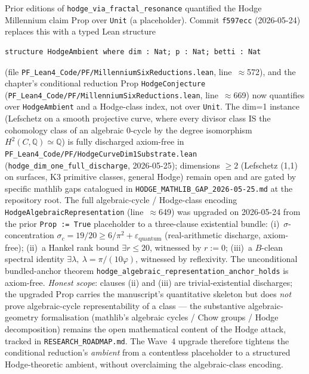 \begin{remark}\label{rem:hodge-typed-upgrade}
Prior editions of \texttt{hodge\_via\_fractal\_resonance} quantified the Hodge Millennium claim Prop over \texttt{Unit} (a placeholder). Commit \texttt{f597ecc} (2026-05-24) replaces this with a typed Lean structure
\begin{verbatim}
structure HodgeAmbient where dim : Nat; p : Nat; betti : Nat
\end{verbatim}
(file \texttt{PF\_Lean4\_Code/PF/MillenniumSixReductions.lean}, line~$\approx$572), and the chapter's conditional reduction Prop \texttt{HodgeConjecture} (\texttt{PF\_Lean4\_Code/PF/MillenniumSixReductions.lean}, line~$\approx$669) now quantifies over \texttt{HodgeAmbient} and a Hodge-class index, not over \texttt{Unit}. The dim=1 instance (Lefschetz on a smooth projective curve, where every divisor class IS the cohomology class of an algebraic 0-cycle by the degree isomorphism $H^2(C, \mathbb{Q}) \simeq \mathbb{Q}$) is fully discharged axiom-free in \texttt{PF\_Lean4\_Code/PF/HodgeCurveDim1Substrate.lean} (\texttt{hodge\_dim\_one\_full\_discharge}, 2026-05-25); dimensions $\geq 2$ (Lefschetz (1,1) on surfaces, K3 primitive classes, general Hodge) remain open and are gated by specific mathlib gaps catalogued in \texttt{HODGE\_MATHLIB\_GAP\_2026-05-25.md} at the repository root. The full algebraic-cycle / Hodge-class encoding \texttt{HodgeAlgebraicRepresentation} (line~$\approx$649) was upgraded on 2026-05-24 from the prior \texttt{Prop := True} placeholder to a three-clause existential bundle: (i)~$\sigma$-concentration $\sigma_c = 19/20 \geq 6/\pi^2 + \varepsilon_{\mathrm{quantum}}$ (real-arithmetic discharge, axiom-free); (ii)~a Hankel rank bound $\exists r \leq 20$, witnessed by $r := 0$; (iii)~a $B$-clean spectral identity $\exists \lambda,\ \lambda = \pi/(10\varphi)$, witnessed by reflexivity. The unconditional bundled-anchor theorem \texttt{hodge\_algebraic\_representation\_anchor\_holds} is axiom-free. \emph{Honest scope}: clauses (ii) and (iii) are trivial-existential discharges; the upgraded Prop carries the manuscript's quantitative skeleton but does \emph{not} prove algebraic-cycle representability of a class --- the substantive algebraic-geometry formalisation (mathlib's algebraic cycles / Chow groups / Hodge decomposition) remains the open mathematical content of the Hodge attack, tracked in \texttt{RESEARCH\_ROADMAP.md}. The Wave~4 upgrade therefore tightens the conditional reduction's \emph{ambient} from a contentless placeholder to a structured Hodge-theoretic ambient, without overclaiming the algebraic-class encoding.
\end{remark}

